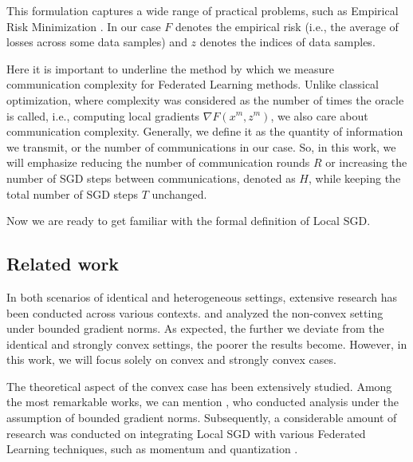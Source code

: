 \vspace{10pt}

This formulation captures a wide range of practical problems, such as Empirical Risk Minimization \citep{Vapnik}. In our case \( F \) denotes the empirical risk (i.e., the average of losses across some data samples) and \( z \) denotes the indices of data samples.

\vspace{10pt}

Here it is important to underline the method by which we measure communication complexity for Federated Learning methods. Unlike classical optimization, where complexity was considered as the number of times the oracle is called, i.e., computing local gradients $\nabla F(x^m, z^m)$, we also care about communication complexity. Generally, we define it as the quantity of information we transmit, or the number of communications in our case.
So, in this work, we will emphasize reducing the number of communication rounds $R$ or increasing the number of SGD steps between communications, denoted as $H$, while keeping the total number of SGD steps $T$ unchanged.

\vspace{10pt}

Now we are ready to get familiar with the formal definition of Local SGD.



\vspace{10pt}

\subsection{Related work}

In {\color{red}both scenarios of identical and heterogeneous settings}, extensive research has been conducted across various contexts. \cite{Li} and \cite{haddapour} analyzed the non-convex setting under bounded gradient norms. As expected, the further we deviate from the {\color{red}identical} and strongly convex settings, the poorer the results become. However, in this work, we will focus solely on convex and strongly convex cases.

\vspace{10pt}

The theoretical aspect of the convex case has been extensively studied. Among the most remarkable works, we can mention \cite{Stich}, who conducted analysis under the assumption of bounded gradient norms. Subsequently, a considerable amount of research was conducted on integrating Local SGD with various Federated Learning techniques, such as momentum and quantization \citep{fedpaq, spider, restarts}.

